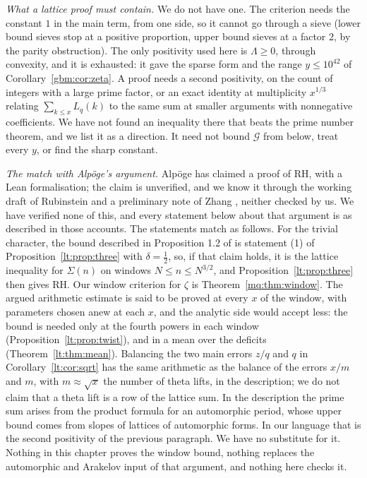 \emph{What a lattice proof must contain.} We do not have one. The criterion needs the constant $1$ in the main term, from one side, so it cannot go through a sieve (lower bound sieves stop at a positive proportion, upper bound sieves at a factor $2$, by the parity obstruction). The only positivity used here is $\Lambda\ge0$, through convexity, and it is exhausted: it gave the sparse form and the range $y\le10^{42}$ of Corollary~\ref{gbm:cor:zeta}. A proof needs a second positivity, on the count of integers with a large prime factor, or an exact identity at multiplicity $x^{1/3}$ relating $\sum_{k\le x}L_q(k)$ to the same sum at smaller arguments with nonnegative coefficients. We have not found an inequality there that beats the prime number theorem, and we list it as a direction. It need not bound $\mathcal G$ from below, treat every $y$, or find the sharp constant.

\emph{The match with Alp\"oge's argument.} Alp\"oge has claimed a proof of RH, with a Lean formalisation; the claim is unverified, and we know it through the working draft of Rubinstein \cite{Rub26} and a preliminary note of Zhang \cite{ZhangR26}, neither checked by us. We have verified none of this, and every statement below about that argument is as described in those accounts. The statements match as follows. For the trivial character, the bound described in Proposition 1.2 of \cite{ZhangR26} is statement (1) of Proposition~\ref{lt:prop:three} with $\delta=\tfrac12$, so, if that claim holds, it is the lattice inequality for $\Sigma(n)$ on windows $N\le n\le N^{3/2}$, and Proposition~\ref{lt:prop:three} then gives RH. Our window criterion for $\zeta$ is Theorem~\ref{mq:thm:window}. The argued arithmetic estimate is said to be proved at every $x$ of the window, with parameters chosen anew at each $x$, and the analytic side would accept less: the bound is needed only at the fourth powers in each window (Proposition~\ref{lt:prop:twist}), and in a mean over the deficits (Theorem~\ref{lt:thm:mean}). Balancing the two main errors $z/q$ and $q$ in Corollary~\ref{lt:cor:sqrt} has the same arithmetic as the balance of the errors $x/m$ and $m$, with $m\approx\sqrt x$ the number of theta lifts, in the description; we do not claim that a theta lift is a row of the lattice sum. In the description the prime sum arises from the product formula for an automorphic period, whose upper bound comes from slopes of lattices of automorphic forms. In our language that is the second positivity of the previous paragraph. We have no substitute for it. Nothing in this chapter proves the window bound, nothing replaces the automorphic and Arakelov input of that argument, and nothing here checks it.
